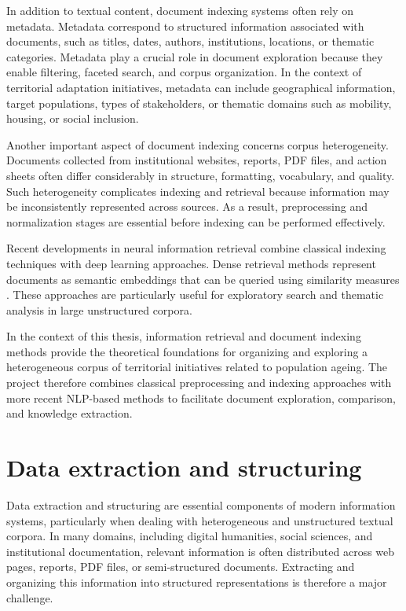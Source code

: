 \documentclass[
11pt,
english,
singlespacing,
headsepline,
]{MastersDoctoralThesis}
\begin{document}
In addition to textual content, document indexing systems often rely on metadata. Metadata correspond to structured information associated with documents, such as titles, dates, authors, institutions, locations, or thematic categories. Metadata play a crucial role in document exploration because they enable filtering, faceted search, and corpus organization. In the context of territorial adaptation initiatives, metadata can include geographical information, target populations, types of stakeholders, or thematic domains such as mobility, housing, or social inclusion.

Another important aspect of document indexing concerns corpus heterogeneity. Documents collected from institutional websites, reports, PDF files, and action sheets often differ considerably in structure, formatting, vocabulary, and quality. Such heterogeneity complicates indexing and retrieval because information may be inconsistently represented across sources. As a result, preprocessing and normalization stages are essential before indexing can be performed effectively.

Recent developments in neural information retrieval combine classical indexing techniques with deep learning approaches. Dense retrieval methods represent documents as semantic embeddings that can be queried using similarity measures \citep{karpukhin2020dense}. These approaches are particularly useful for exploratory search and thematic analysis in large unstructured corpora.

In the context of this thesis, information retrieval and document indexing methods provide the theoretical foundations for organizing and exploring a heterogeneous corpus of territorial initiatives related to population ageing. The project therefore combines classical preprocessing and indexing approaches with more recent NLP-based methods to facilitate document exploration, comparison, and knowledge extraction.

\section{Data extraction and structuring}

Data extraction and structuring are essential components of modern information systems, particularly when dealing with heterogeneous and unstructured textual corpora. In many domains, including digital humanities, social sciences, and institutional documentation, relevant information is often distributed across web pages, reports, PDF files, or semi-structured documents. Extracting and organizing this information into structured representations is therefore a major challenge.
\end{document}

